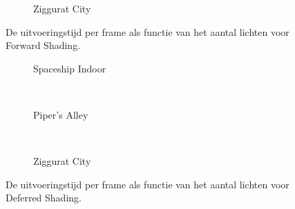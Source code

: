 \begin{figure}[t]
\begin{minipage}[t]{0.5\textwidth}
  \begin{adjustbox}{minipage=\textwidth, scale=0.55}
    \begin{subfigure}[b]{1.6\textwidth}
      \centering
      \def\svgwidth{\textwidth}
      
      \caption{Ziggurat City}
      \label{fig:hs-compare-lights:forward:city}
    \end{subfigure}
  \end{adjustbox}
  \caption{\small De uitvoeringstijd per frame als functie van het aantal lichten voor Forward Shading.}
  \label{fig:hs-compare-lights:forward}
  \end{minipage}%
  \begin{minipage}[t]{0.5\textwidth}
  \begin{adjustbox}{minipage=\textwidth, scale=0.55}
    \begin{subfigure}[b]{1.6\textwidth}
      \centering
      \def\svgwidth{\textwidth}
      
      \caption{Spaceship Indoor}
      \vspace{4pt}
      \label{fig:hs-compare-lights:deferred:indoor}
    \end{subfigure}
  \end{adjustbox} \\
  \begin{adjustbox}{minipage=\textwidth, scale=0.55}
    \begin{subfigure}[b]{1.6\textwidth}
      \centering
      \def\svgwidth{\textwidth}
      
      \caption{Piper's Alley}
      \vspace{4pt}
      \label{fig:hs-compare-lights:deferred:alley}
    \end{subfigure}
  \end{adjustbox} \\
  \begin{adjustbox}{minipage=\textwidth, scale=0.55}
    \begin{subfigure}[b]{1.6\textwidth}
      \centering
      \def\svgwidth{\textwidth}
      
      \caption{Ziggurat City}
      \label{fig:hs-compare-lights:deferred:city}
    \end{subfigure}
  \end{adjustbox}
  \caption{\small De uitvoeringstijd per frame als functie van het aantal lichten voor Deferred Shading.}
  \label{fig:hs-compare-lights:deferred}
  \end{minipage} 
\end{figure}
